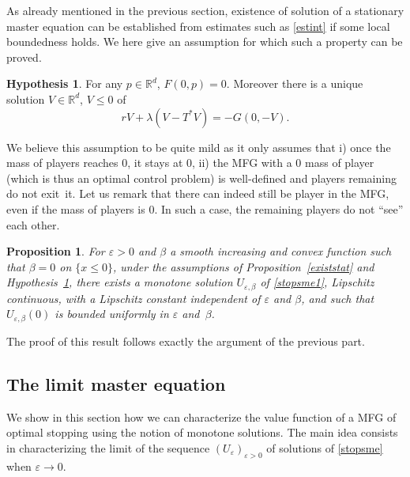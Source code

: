 \documentclass[JEP,XML,SOM,Unicode,NoEqCountersInSection,published]{cedram}
\let\epsilon\varepsilon
\newtheorem{Prop}{Proposition}[section]
\theoremstyle{definition}
\newtheorem{hyp}{Hypothesis}
\begin{document}
As already mentioned in the previous section, existence of solution of a stationary master equation can be established from estimates such as \eqref{estint} if some local boundedness holds. We here give an assumption for which such a property can be proved.
\begin{hyp}\label{existstop}
For any $p\in \mathbb{R}^d$, $F(0,p) = 0$. Moreover there is a unique solution $V \in \mathbb{R}^d$, $V \leq 0$ of\vspace*{-5pt}
\begin{equation*}
rV+\lambda (V-T^*V) = -G(0,-V).
\end{equation*}
\end{hyp}
We believe this assumption to be quite mild as it only assumes that i) once the mass of players reaches $0$, it stays at $0$, ii) the MFG with a $0$ mass of player (which is thus an optimal control problem) is well-defined and players remaining do not exit~it. Let us remark that there can indeed still be player in the MFG, even if the mass of players is $0$. In such a case, the remaining players do not ``see'' each other.
\begin{Prop}\label{resume}
For $\epsilon > 0$ and $\beta$ a smooth increasing and convex function such that $\beta =0 $ on $\{x \leq 0\}$, under the assumptions of Proposition~\ref{existstat} and Hypothesis~\ref{existstop}, there exists a monotone solution $U_{\epsilon,\beta}$ of \eqref{stopsme1}, Lipschitz continuous, with a Lipschitz constant independent of $\epsilon$ and $\beta$, and such that $U_{\epsilon,\beta}(0)$ is bounded uniformly in $\epsilon$ and~$\beta$.
\end{Prop}
The proof of this result follows exactly the argument of the previous part.

\subsection{The limit master equation}
We show in this section how we can characterize the value function of a MFG of optimal stopping using the notion of monotone solutions. The main idea consists in characterizing the limit of the sequence $(U_{\epsilon})_{\epsilon > 0}$ of solutions of \eqref{stopsme} when $\epsilon \to 0$.
\end{document}
